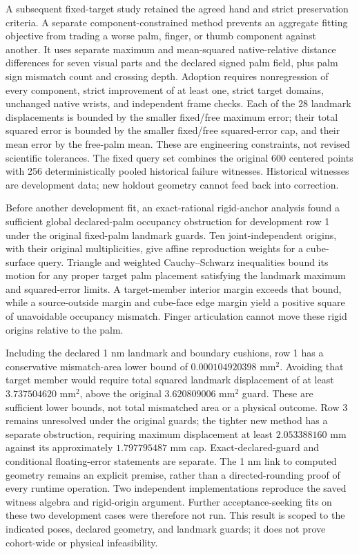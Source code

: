 \documentclass[10pt,letterpaper]{article}
\begin{document}
A subsequent fixed-target study retained the agreed hand and strict preservation
criteria. A separate component-constrained method prevents an aggregate fitting
objective from trading a worse palm, finger, or thumb component against another.
It uses separate maximum and mean-squared native-relative distance differences
for seven visual parts and the declared signed palm field, plus palm sign mismatch
count and crossing depth. Adoption requires nonregression of every component,
strict improvement of at least one, strict target domains, unchanged native
wrists, and independent frame checks. Each of the 28 landmark displacements is bounded by the smaller fixed/free
maximum error; their total squared error is bounded by the smaller fixed/free
squared-error cap, and their mean error by the free-palm mean. These are engineering constraints, not revised scientific
tolerances. The fixed query set combines the original 600 centered points with
256 deterministically pooled historical failure witnesses. Historical witnesses
are development data; new holdout geometry cannot feed back into correction.

Before another development fit, an exact-rational rigid-anchor analysis found a
sufficient global declared-palm occupancy obstruction for development row 1
under the original fixed-palm landmark guards. Ten joint-independent origins,
with their original multiplicities, give affine reproduction weights for a
cube-surface query. Triangle and weighted Cauchy--Schwarz inequalities bound its
motion for any proper target palm placement satisfying the landmark maximum and
squared-error limits. A target-member interior margin exceeds that bound, while
a source-outside margin and cube-face edge margin yield a positive square of
unavoidable occupancy mismatch. Finger articulation cannot move these rigid
origins relative to the palm.

Including the declared 1 nm landmark and boundary cushions, row 1 has a
conservative mismatch-area lower bound of $0.000104920398$ mm$^2$. Avoiding
that target member would require total squared landmark displacement of at least
$3.737504620$ mm$^2$, above the original $3.620809006$ mm$^2$ guard.
These are sufficient lower bounds, not total mismatched area or a physical
outcome. Row 3 remains unresolved under the original guards; the tighter new
method has a separate obstruction, requiring maximum displacement at least
$2.053388160$ mm against its approximately $1.797795487$ mm cap. Exact-declared-guard and
conditional floating-error statements are separate. The 1 nm link to computed
geometry remains an explicit premise, rather than a directed-rounding proof
of every runtime operation. Two independent implementations reproduce the saved
witness algebra and rigid-origin argument. Further acceptance-seeking fits on
these two development cases were therefore not run. This result is scoped to
the indicated poses, declared geometry, and landmark guards; it does not prove
cohort-wide or physical infeasibility.
\end{document}
